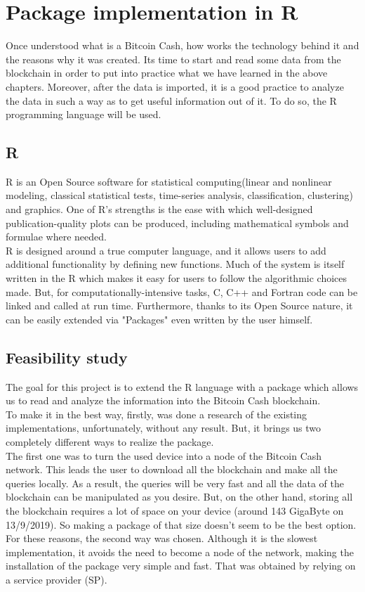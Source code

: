 
\chapter{Package implementation in R}
\label{cha:R}

Once understood what is a Bitcoin Cash, how works the technology behind it and the
reasons why it was created. Its time to start and read some data from the blockchain
in order to put into practice what we have learned in the above chapters. Moreover,
after the data is imported, it is a good practice to analyze the data in such a way as to 
get useful information out of it. To do so, the R programming language will be used.

\section{R}
\label{sec:enivirionment}

R is an Open Source software for statistical computing(linear and nonlinear
 modeling, classical statistical tests, time-series analysis, classification,
 clustering) and graphics. One of R’s strengths is the ease with which well-designed 
 publication-quality plots can be produced, including mathematical symbols and 
 formulae where needed.\\
R is designed around a true computer language, and it allows users to add additional 
functionality by defining new functions. Much of the system is itself written in the 
R which makes it easy for users to follow the algorithmic choices made. But, for
computationally-intensive tasks, C, C++ and Fortran code can be linked and called 
at run time. Furthermore, thanks to its Open Source nature, it can be easily extended
via "Packages" even written by the user himself.\cite{r}

\section{Feasibility study}
\label{sec:study}

The goal for this project is to extend the R language with a package which allows us
to read and analyze the information into the Bitcoin Cash blockchain.\\
To make it in the best way, firstly, was done a research of the existing 
implementations, unfortunately, without any result. But, it brings us two 
completely different ways to realize the package. \\
The first one was to turn the used device into a node of the Bitcoin Cash network.
This leads the user to download all the blockchain and make all the queries locally.
As a result, the queries will be very fast and all the data of the blockchain can
be manipulated as you desire. But, on the other hand, storing all the blockchain 
requires a lot of space on your device (around 143 GigaByte on 13/9/2019). So making
a package of that size doesn't seem to be the best option.\\
For these reasons, the second way was chosen. Although it is the slowest implementation,
it avoids the need to become a node of the network, making the installation of the
package very simple and fast. That was obtained by relying on a service provider (SP).


